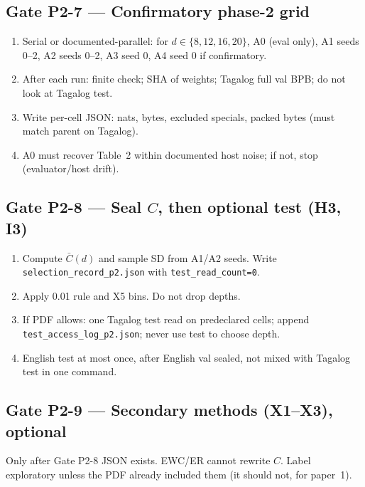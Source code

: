 \documentclass[11pt,a4paper]{article}
\begin{document}
\subsection{Gate P2-7 --- Confirmatory phase-2 grid}
\begin{enumerate}
\item Serial or documented-parallel: for $d\in\{8,12,16,20\}$, A0 (eval only), A1 seeds 0--2, A2 seeds 0--2, A3 seed 0, A4 seed 0 if confirmatory.
\item After each run: finite check; SHA of weights; Tagalog full val BPB; do not look at Tagalog test.
\item Write per-cell JSON: nats, bytes, excluded specials, packed bytes (must match parent on Tagalog).
\item A0 must recover Table~2 within documented host noise; if not, stop (evaluator/host drift).
\end{enumerate}

\subsection{Gate P2-8 --- Seal $C$, then optional test (H3, I3)}
\begin{enumerate}
\item Compute $\bar C(d)$ and sample SD from A1/A2 seeds. Write \texttt{selection\_record\_p2.json} with \texttt{test\_read\_count=0}.
\item Apply 0.01 rule and X5 bins. Do not drop depths.
\item If PDF allows: one Tagalog test read on predeclared cells; append \texttt{test\_access\_log\_p2.json}; never use test to choose depth.
\item English test at most once, after English val sealed, not mixed with Tagalog test in one command.
\end{enumerate}

\subsection{Gate P2-9 --- Secondary methods (X1--X3), optional}
Only after Gate P2-8 JSON exists. EWC/ER cannot rewrite $C$. Label exploratory unless the PDF already included them (it should not, for paper~1).
\end{document}
